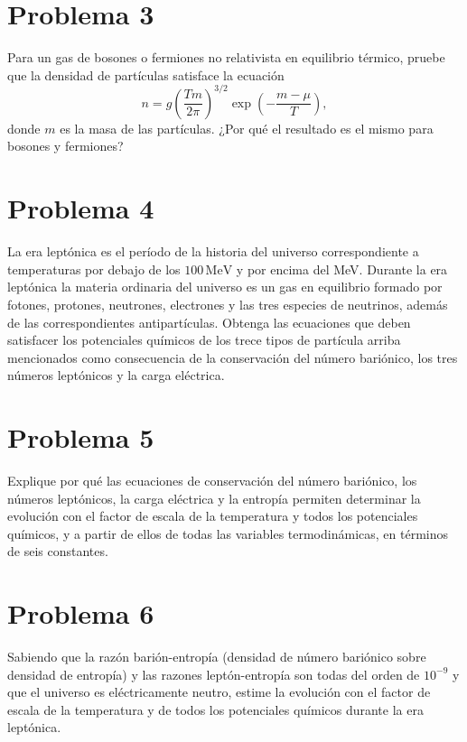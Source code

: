\documentclass[11pt,a4paper]{article}
\begin{document}
\section*{Problema 3}
Para un gas de bosones o fermiones no relativista en equilibrio térmico, pruebe que la densidad de partículas satisface la ecuación
\begin{equation}
  n=g\left(\frac{Tm}{2\pi}\right)^{3/2}\exp\left(-\frac{m-\mu}{T}\right),
\end{equation}
donde $m$ es la masa de las partículas. ¿Por qué el resultado es el mismo para bosones y fermiones?

\section*{Problema 4}
La era leptónica es el período de la historia del universo correspondiente a temperaturas por debajo de los $100\,\text{MeV}$ y por encima del MeV. Durante la era leptónica la materia ordinaria del universo es un gas en equilibrio formado por fotones, protones, neutrones, electrones y las tres especies de neutrinos, además de las correspondientes antipartículas. Obtenga las ecuaciones que deben satisfacer los potenciales químicos de los trece tipos de partícula arriba mencionados como consecuencia de la conservación del número bariónico, los tres números leptónicos y la carga eléctrica.

\section*{Problema 5}
Explique por qué las ecuaciones de conservación del número bariónico, los números leptónicos, la carga eléctrica y la entropía permiten determinar la evolución con el factor de escala de la temperatura y todos los potenciales químicos, y a partir de ellos de todas las variables termodinámicas, en términos de seis constantes.

\section*{Problema 6}
Sabiendo que la razón barión-entropía (densidad de número bariónico sobre densidad de entropía) y las razones leptón-entropía son todas del orden de $10^{-9}$ y que el universo es eléctricamente neutro, estime la evolución con el factor de escala de la temperatura y de todos los potenciales químicos durante la era leptónica.
\end{document}
